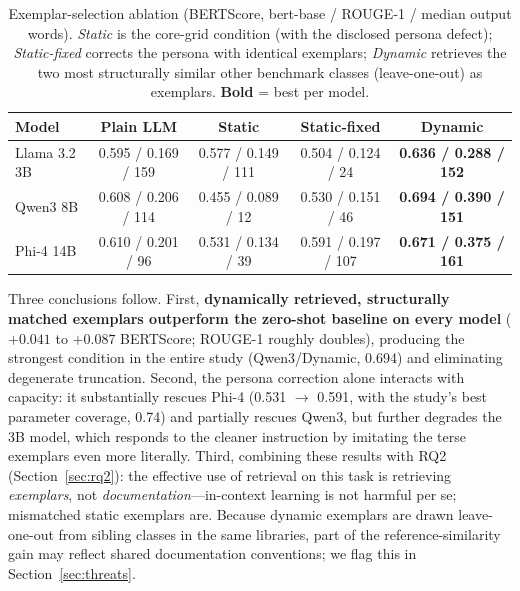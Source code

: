 \documentclass[pdflatex,sn-mathphys-ay]{sn-jnl}%
\theoremstyle{thmstyleone}%
\theoremstyle{thmstyletwo}%
\theoremstyle{thmstylethree}%
\begin{document}
\begin{table}[h]
\centering
\small
\caption{Exemplar-selection ablation (BERTScore, bert-base / ROUGE-1 / median output words). \emph{Static} is the core-grid condition (with the disclosed persona defect); \emph{Static-fixed} corrects the persona with identical exemplars; \emph{Dynamic} retrieves the two most structurally similar other benchmark classes (leave-one-out) as exemplars. \textbf{Bold} = best per model.}
\label{tab:fewshot-ablation}
\begin{tabular}{lcccc}
\toprule
\textbf{Model} & \textbf{Plain LLM} & \textbf{Static} & \textbf{Static-fixed} & \textbf{Dynamic} \\
\midrule
Llama 3.2 3B & 0.595 / 0.169 / 159 & 0.577 / 0.149 / 111 & 0.504 / 0.124 / 24 & \textbf{0.636 / 0.288 / 152} \\
Qwen3 8B     & 0.608 / 0.206 / 114 & 0.455 / 0.089 / 12  & 0.530 / 0.151 / 46  & \textbf{0.694 / 0.390 / 151} \\
Phi-4 14B    & 0.610 / 0.201 / 96  & 0.531 / 0.134 / 39  & 0.591 / 0.197 / 107 & \textbf{0.671 / 0.375 / 161} \\
\bottomrule
\end{tabular}
\end{table}

Three conclusions follow. First, \textbf{dynamically retrieved, structurally matched exemplars outperform the zero-shot baseline on every model} ($+0.041$ to $+0.087$ BERTScore; ROUGE-1 roughly doubles), producing the strongest condition in the entire study (Qwen3/Dynamic, 0.694) and eliminating degenerate truncation. Second, the persona correction alone interacts with capacity: it substantially rescues Phi-4 (0.531 $\rightarrow$ 0.591, with the study's best parameter coverage, 0.74) and partially rescues Qwen3, but further degrades the 3B model, which responds to the cleaner instruction by imitating the terse exemplars even more literally. Third, combining these results with RQ2 (Section~\ref{sec:rq2}): the effective use of retrieval on this task is retrieving \emph{exemplars}, not \emph{documentation}---in-context learning is not harmful per se; mismatched static exemplars are. Because dynamic exemplars are drawn leave-one-out from sibling classes in the same libraries, part of the reference-similarity gain may reflect shared documentation conventions; we flag this in Section~\ref{sec:threats}.

\end{document}
